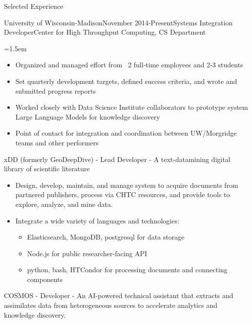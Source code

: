\documentclass{resume} %
\begin{document}
\begin{rSection}{Selected Experience}
\begin{rSubsection}{University of Wisconsin-Madison}{November
    2014-Present}{Systems Integration Developer}{Center for High Throughput
    Computing, CS Department}
\begin{itemize}{}{\leftmargin=1.5em}
        \begin{itemize}{}{\leftmargin=1.25em} 
          \itemsep -0.3em \vspace{-0.3em} %
          \item Organized and managed effort from ~2 full-time employees and 2-3 students 
          \item Set quarterly development targets, defined success criteria, and
              wrote and submitted progress reports
          \item Worked closely with Data Science Institute collaborators to
              prototype system Large Language Models for knowledge discovery
          \item Point of contact for integration and coordination between
              UW/Morgridge teams and other performers
        \end{itemize}
    \end{itemize}
\item xDD (formerly GeoDeepDive) - Lead Developer - A text-datamining digital library of
    scientific literature
    \begin{itemize}{}{\leftmargin=1.5em} 
      \renewcommand\labelitemi{$\cdot$}
      \itemsep -0.5em \vspace{-0.5em} %
      \item Design, develop, maintain, and manage system to acquire
          documents from partnered publishers, process via CHTC resources,
          and provide tools to explore, analyze, and mine data.
      \item Integrate a wide variety of languages and technologies:
        \renewcommand\labelitemi{$\cdot$}
        \begin{itemize}{}{\leftmargin=1.25em} 
          \itemsep -0.3em \vspace{-0.3em} %
          \item Elasticsearch, MongoDB, postgresql for data storage
          \item Node.js for public researcher-facing API
          \item python, bash, HTCondor for processing documents and
          connecting components
        \end{itemize}
    \end{itemize}
\item COSMOS - Developer - An AI-powered technical assistant that extracts and assimilates data from heterogeneous sources to accelerate analytics and knowledge discovery. 

\end{rSubsection}
\end{rSection}
\end{document}
